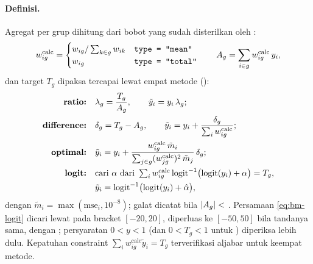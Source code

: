 \paragraph{Definisi.} Agregat per grup dihitung dari bobot yang sudah
disterilkan oleh :
\begin{equation}
  w^{\text{calc}}_{ig}=
  \begin{cases}
    w_{ig}/\sum_{k\in g}w_{ik} & \text{\texttt{type = "mean"}}\\
    w_{ig} & \text{\texttt{type = "total"}}
  \end{cases}
  \qquad
  A_g=\sum_{i\in g}w^{\text{calc}}_{ig}\,y_i,
  \label{eq:bm-agg}
\end{equation}
dan target $T_g$ dipaksa tercapai lewat empat metode
():
\begin{align}
  \text{\textbf{ratio:}}\quad
    &\lambda_g=\frac{T_g}{A_g},\qquad \tilde y_i=y_i\,\lambda_g;
    \label{eq:bm-ratio}\\
  \text{\textbf{difference:}}\quad
    &\delta_g=T_g-A_g,\qquad
      \tilde y_i=y_i+\frac{\delta_g}{\sum_i w^{\text{calc}}_{ig}};
    \label{eq:bm-diff}\\
  \text{\textbf{optimal:}}\quad
    &\tilde y_i=y_i+\frac{w^{\text{calc}}_{ig}\,\tilde m_i}
      {\sum_{j\in g}(w^{\text{calc}}_{jg})^2\,\tilde m_j}\,\delta_g;
    \label{eq:bm-opt}\\
  \text{\textbf{logit:}}\quad
    &\text{cari }\alpha\text{ dari }\textstyle
      \sum_i w^{\text{calc}}_{ig}\,
      \mathrm{logit}^{-1}\bigl(\mathrm{logit}(y_i)+\alpha\bigr)=T_g,\notag\\
    &\tilde y_i=\mathrm{logit}^{-1}\bigl(\mathrm{logit}(y_i)+\hat\alpha\bigr),
    \label{eq:bm-logit}
\end{align}
dengan $\tilde m_i=\max(\mathrm{mse}_i,10^{-8})$; galat
 dicatat bila $\left|A_g\right|<$ . Persamaan
\eqref{eq:bm-logit} dicari lewat  pada bracket
$[-20,20]$, diperluas ke $[-50,50]$ bila tandanya sama, dengan
; persyaratan $0<y<1$ (dan $0<T_g<1$ untuk
) diperiksa lebih dulu. Kepatuhan constraint
$\sum_i w^{\text{calc}}_{ig}\tilde y_i=T_g$ terverifikasi aljabar untuk
keempat metode.



